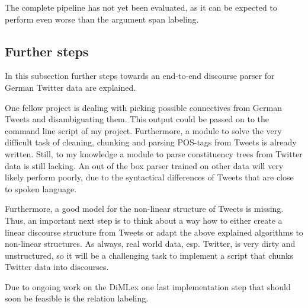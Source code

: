 \documentclass[10pt,a4paper]{article}
\begin{document}
The complete pipeline has not yet been evaluated, as it can be expected to perform even worse than the argument span labeling.


\subsection{Further steps}
In this subsection further steps towards an end-to-end discourse parser for German Twitter data are explained.

One fellow project is dealing with picking possible connectives from German Tweets and disambiguating them. This output could be passed on to the command line script of my project. Furthermore, a module to solve the very difficult task of cleaning, chunking and parsing POS-tags from Tweets is already written. Still, to my knowledge a module to parse constituency trees from Twitter data is still lacking. An out of the box parser trained on other data will very likely perform poorly, due to the syntactical differences of Tweets that are close to spoken language.

Furthermore, a good model for the non-linear structure of Tweets is missing. Thus, an important next step is to think about a way how to either create a linear discourse structure from Tweets or adapt the above explained algorithms to non-linear structures. 
As always, real world data, esp. Twitter, is very dirty and unstructured, so it will be a challenging task to implement a script that chunks Twitter data into discourses.

Due to ongoing work on the DiMLex one last implementation step that should soon be feasible is the relation labeling.




\end{document}
